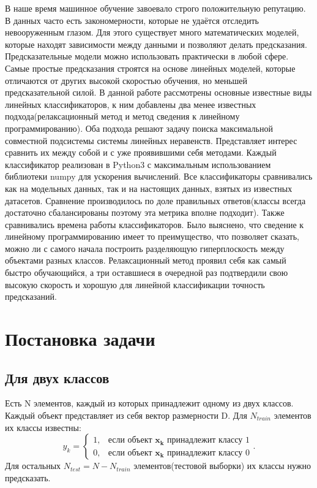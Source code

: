 \documentclass[a4paper]{article}
\newcommand{\yk}{y_k}
\newcommand{\xk}{\bm{x_k}}
\begin{document}
В наше время машинное обучение завоевало строго положительную репутацию. В данных часто есть закономерности, которые не удаётся отследить невооруженным глазом. Для этого существует много математических моделей, которые находят зависимости между данными и позволяют делать предсказания. Предсказательные модели можно использовать практически в любой сфере. Самые простые предсказания строятся на основе линейных моделей, которые отличаются от других высокой скоростью обучения, но меньшей предсказательной силой. В данной работе рассмотрены основные известные виды линейных классификаторов, к ним добавлены два менее известных подхода(релаксационный метод и метод сведения к линейному программированию). Оба подхода решают задачу поиска максимальной совместной подсистемы системы линейных неравенств. Представляет интерес сравнить их между собой и с уже проявившими себя методами. Каждый классификатор реализован в Python3 с максимальным использованием библиотеки numpy для ускорения вычислений. Все классификаторы сравнивались как на модельных данных, так и на настоящих данных, взятых из известных датасетов. Сравнение производилось по доле правильных ответов(классы всегда достаточно сбалансированы поэтому эта метрика вполне подходит). Также сравнивались времена работы классификаторов. Было выяснено, что сведение к линейному программированию имеет то преимущество, что позволяет сказать, можно ли с самого начала построить разделяющую гиперплоскость между объектами разных классов. Релаксационный метод проявил себя как самый быстро обучающийся, а три оставшиеся в очередной раз подтвердили свою высокую скорость и хорошую для линейной классификации точность предсказаний.

\section{Постановка задачи}

\subsection{Для двух классов}
Есть N элементов, каждый из которых принадлежит одному из двух классов. Каждый объект представляет из себя вектор размерности D.  Для $N_{train}$ элементов их классы известны: 
$$\yk = \begin{cases}
1, & \text{если объект } \xk \text{ принадлежит классу 1}\\
0, & \text{если объект } \xk \text{ принадлежит классу 0}
\end{cases}.
$$Для остальных $N_{test} = N - N_{train}$ элементов(тестовой выборки) их классы нужно предсказать.
\end{document}

